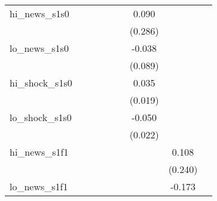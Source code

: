 {\begin{tabular}{l*{8}{c}}
\addlinespace
hi\_news\_s1s0&                     &                     &                     &                     &                     &       0.090         &                     &                     \\
            &                     &                     &                     &                     &                     &     (0.286)         &                     &                     \\
\addlinespace
lo\_news\_s1s0&                     &                     &                     &                     &                     &      -0.038         &                     &                     \\
            &                     &                     &                     &                     &                     &     (0.089)         &                     &                     \\
\addlinespace
hi\_shock\_s1s0&                     &                     &                     &                     &                     &       0.035\sym{*}  &                     &                     \\
            &                     &                     &                     &                     &                     &     (0.019)         &                     &                     \\
\addlinespace
lo\_shock\_s1s0&                     &                     &                     &                     &                     &      -0.050\sym{**} &                     &                     \\
            &                     &                     &                     &                     &                     &     (0.022)         &                     &                     \\
\addlinespace
hi\_news\_s1f1&                     &                     &                     &                     &                     &                     &       0.108         &                     \\
            &                     &                     &                     &                     &                     &                     &     (0.240)         &                     \\
\addlinespace
lo\_news\_s1f1&                     &                     &                     &                     &                     &                     &      -0.173         &                     \\

\end{tabular}}
